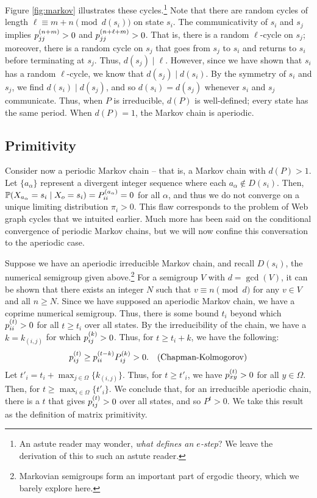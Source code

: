 \documentclass[../exploring-pagerank.tex]{subfiles}
\begin{document}
	Figure \ref{fig:markov} illustrates these cycles.\footnote{An astute reader may wonder, \textit{what defines an $e$-step}? We leave the derivation of this to such an astute reader.} Note that there are random cycles of length $\ell \equiv m+n \pmod{d(s_i)}$ on state $s_i$. The communicativity of $s_i$ and $s_j$ implies $p^{(n+m)}_{jj} > 0$ and $p^{(n + \ell + m)}_{jj} > 0$. That is, there is a random $\ell$-cycle on $s_j$; moreover, there is a random cycle on $s_j$ that goes from $s_j$ to $s_i$ and returns to $s_i$ before terminating at $s_j$. Thus, $d(s_j) \mid \ell$. However, since we have shown that $s_i$ has a random $\ell$-cycle, we know that $d(s_j) \mid d(s_i)$. By the symmetry of $s_i$ and $s_j$, we find $d(s_i) \mid d(s_j)$, and so $d(s_i) = d(s_j)$ whenever $s_i$ and $s_j$ communicate. Thus, when $P$ is irreducible, $d(P)$ is well-defined; every state has the same period. When $d(P) = 1$, the Markov chain is aperiodic.

    \subsection{Primitivity}
    Consider now a periodic Markov chain -- that is, a Markov chain with $d(P) > 1$. Let $\{a_\alpha\}$ represent a divergent integer sequence where each $a_\alpha \notin D(s_i)$. Then, $\mathbb{P}(X_{a_\alpha} = s_i \mid X_o = s_i) = P^{(a_\alpha)}_{ii} = 0$ for all $\alpha$, and thus we do not converge on a unique limiting distribution $\pi_i > 0$. This flaw corresponds to the problem of Web graph cycles that we intuited earlier. Much more has been said on the conditional convergence of periodic Markov chains, but we will now confine this conversation to the aperiodic case.
    
    Suppose we have an aperiodic irreducible Markov chain, and recall $D(s_i)$, the numerical semigroup given above.\footnote{Markovian semigroups form an important part of ergodic theory, which we barely explore here.} For a semigroup $V$ with $d=\gcd(V)$, it can be shown that there exists an integer $N$ such that $v\equiv n \pmod{d}$ for any $v\in V$ and all $n \geq N$. Since we have supposed an aperiodic Markov chain, we have a coprime numerical semigroup. Thus, there is some bound $t_i$ beyond which $p^{(t)}_{ii} > 0$ for all $t \geq t_i$ over all states. By the irreducibility of the chain, we have a $k = k_{(i,j)}$ for which $p^{(k)}_{ij} > 0$. Thus, for $t \geq t_i + k$, we have the following:
    \begin{align*}
        p^{(t)}_{ij} \geq p^{(t-k)}_{ii} P^{(k)}_{ij} > 0. && \text{(Chapman-Kolmogorov)}
    \end{align*}
    Let $t'_i = t_i + \max_{j\in\Omega}\{ k_{(i,j)} \}$. Thus, for $t \geq t'_i$, we have $p^{(t)}_{xy} > 0$ for all $y\in\Omega$. Then, for $t \geq \max_{i\in\Omega}\{ t'_i \}$. We conclude that, for an irreducible aperiodic chain, there is a $t$ that gives $p^{(t)}_{ij} > 0$ over all states, and so $P^t > 0$. We take this result as the definition of matrix primitivity.
\end{document}
